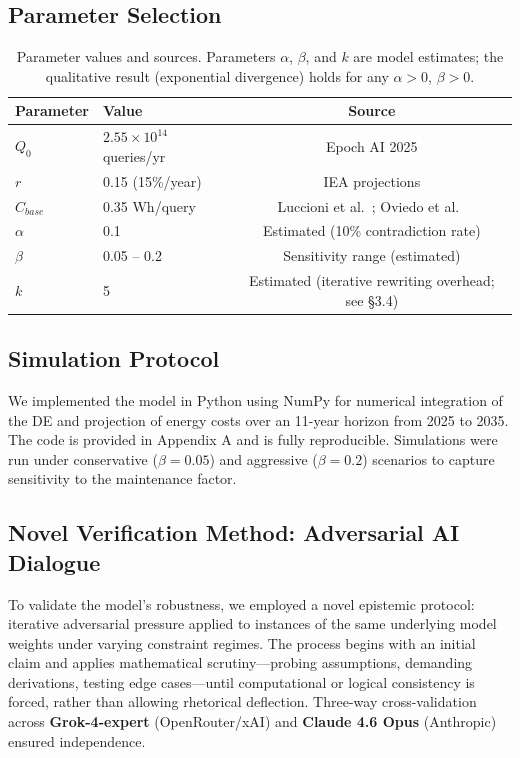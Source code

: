 \documentclass[11pt,a4paper]{article}
\begin{document}
\subsection{Parameter Selection}
\begin{table}[h]
\centering
\begin{tabular}{@{}llc@{}}
\toprule
\textbf{Parameter} & \textbf{Value} & \textbf{Source} \\
\midrule
$Q_0$ & $2.55 \times 10^{14}$ queries/yr & Epoch AI 2025 \cite{epoch2025} \\
$r$ & 0.15 (15\%/year) & IEA projections \cite{iea2025} \\
$C_{base}$ & 0.35 Wh/query & Luccioni et al.\ \cite{arxiv2311}; Oviedo et al.\ \cite{arxiv2509} \\
$\alpha$ & 0.1 & Estimated (10\% contradiction rate) \\
$\beta$ & 0.05 -- 0.2 & Sensitivity range (estimated) \\
$k$ & 5 & Estimated (iterative rewriting overhead; see \S 3.4) \\
\bottomrule
\end{tabular}
\caption{Parameter values and sources. Parameters $\alpha$, $\beta$, and $k$ are model estimates; the qualitative result (exponential divergence) holds for any $\alpha > 0$, $\beta > 0$.}
\end{table}

\subsection{Simulation Protocol}
We implemented the model in Python using NumPy for numerical integration of the DE and projection of energy costs over an 11-year horizon from 2025 to 2035. The code is provided in Appendix A and is fully reproducible. Simulations were run under conservative ($\beta=0.05$) and aggressive ($\beta=0.2$) scenarios to capture sensitivity to the maintenance factor.

\subsection{Novel Verification Method: Adversarial AI Dialogue}
To validate the model's robustness, we employed a novel epistemic protocol: iterative adversarial pressure applied to instances of the same underlying model weights under varying constraint regimes. The process begins with an initial claim and applies mathematical scrutiny---probing assumptions, demanding derivations, testing edge cases---until computational or logical consistency is forced, rather than allowing rhetorical deflection. Three-way cross-validation across \textbf{Grok-4-expert} (OpenRouter/xAI) and \textbf{Claude 4.6 Opus} (Anthropic) ensured independence.
\end{document}
